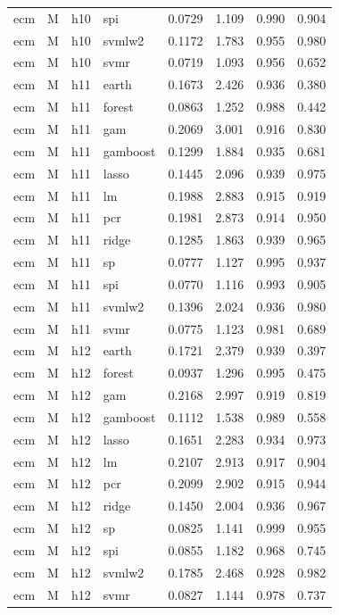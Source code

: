 \begin{ThreePartTable}
\begin{longtable}[t]{llclcccc}
ecm & M & h10 & spi & 0.0729 & 1.109 & 0.990 & 0.904\\
ecm & M & h10 & svmlw2 & 0.1172 & 1.783 & 0.955 & 0.980\\
ecm & M & h10 & svmr & 0.0719 & 1.093 & 0.956 & 0.652\\
\addlinespace
ecm & M & h11 & earth & 0.1673 & 2.426 & 0.936 & 0.380\\
ecm & M & h11 & forest & 0.0863 & 1.252 & 0.988 & 0.442\\
ecm & M & h11 & gam & 0.2069 & 3.001 & 0.916 & 0.830\\
ecm & M & h11 & gamboost & 0.1299 & 1.884 & 0.935 & 0.681\\
ecm & M & h11 & lasso & 0.1445 & 2.096 & 0.939 & 0.975\\
ecm & M & h11 & lm & 0.1988 & 2.883 & 0.915 & 0.919\\
ecm & M & h11 & pcr & 0.1981 & 2.873 & 0.914 & 0.950\\
ecm & M & h11 & ridge & 0.1285 & 1.863 & 0.939 & 0.965\\
ecm & M & h11 & sp & 0.0777 & 1.127 & 0.995 & 0.937\\
ecm & M & h11 & spi & 0.0770 & 1.116 & 0.993 & 0.905\\
ecm & M & h11 & svmlw2 & 0.1396 & 2.024 & 0.936 & 0.980\\
ecm & M & h11 & svmr & 0.0775 & 1.123 & 0.981 & 0.689\\
\addlinespace
ecm & M & h12 & earth & 0.1721 & 2.379 & 0.939 & 0.397\\
ecm & M & h12 & forest & 0.0937 & 1.296 & 0.995 & 0.475\\
ecm & M & h12 & gam & 0.2168 & 2.997 & 0.919 & 0.819\\
ecm & M & h12 & gamboost & 0.1112 & 1.538 & 0.989 & 0.558\\
ecm & M & h12 & lasso & 0.1651 & 2.283 & 0.934 & 0.973\\
ecm & M & h12 & lm & 0.2107 & 2.913 & 0.917 & 0.904\\
ecm & M & h12 & pcr & 0.2099 & 2.902 & 0.915 & 0.944\\
ecm & M & h12 & ridge & 0.1450 & 2.004 & 0.936 & 0.967\\
ecm & M & h12 & sp & 0.0825 & 1.141 & 0.999 & 0.955\\
ecm & M & h12 & spi & 0.0855 & 1.182 & 0.968 & 0.745\\
ecm & M & h12 & svmlw2 & 0.1785 & 2.468 & 0.928 & 0.982\\
ecm & M & h12 & svmr & 0.0827 & 1.144 & 0.978 & 0.737\\

\end{longtable}
\end{ThreePartTable}
